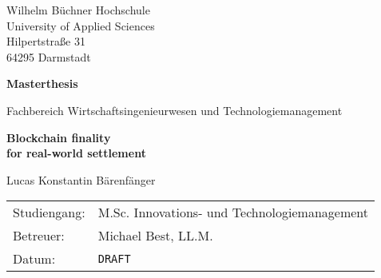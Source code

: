 \begin{titlepage}

	\large
	Wilhelm Büchner Hochschule \\
	University of Applied Sciences \\
	Hilpertstraße 31 \\
	64295 Darmstadt

	\vfill

	\begin{center}
		\Large
			\textbf{Masterthesis}

			\vspace{0.5cm}

			Fachbereich Wirtschaftsingenieurwesen und Technologiemanagement

			\vfill

		\Huge
			\textbf{
				Blockchain finality \\
				for real-world settlement
			}

			\vfill

		\Large
			Lucas Konstantin Bärenfänger
	\end{center}

	\vfill
	
	\begin{tabularx}{\textwidth}{@{}l X}
		Studiengang:    & M.Sc. Innovations- und Technologiemanagement \\
		Betreuer:       & Michael Best, LL.M. \\
		Datum:          & \texttt{DRAFT}
	\end{tabularx}

\end{titlepage}
